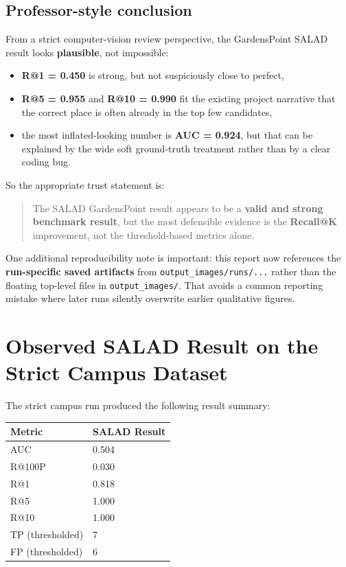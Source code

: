 \documentclass[11pt]{article}
\begin{document}
\subsection*{Professor-style conclusion}
From a strict computer-vision review perspective, the GardensPoint SALAD result looks \textbf{plausible}, not impossible:
\begin{itemize}[leftmargin=*]
  \item \textbf{R@1 = 0.450} is strong, but not suspiciously close to perfect,
  \item \textbf{R@5 = 0.955} and \textbf{R@10 = 0.990} fit the existing project narrative that the correct place is often already in the top few candidates,
  \item the most inflated-looking number is \textbf{AUC = 0.924}, but that can be explained by the wide soft ground-truth treatment rather than by a clear coding bug.
\end{itemize}

So the appropriate trust statement is:
\begin{quote}
The SALAD GardensPoint result appears to be a \textbf{valid and strong benchmark result}, but the most defensible evidence is the \textbf{Recall@K} improvement, not the threshold-based metrics alone.
\end{quote}

One additional reproducibility note is important: this report now references the \textbf{run-specific saved artifacts} from \texttt{output\_images/runs/...} rather than the floating top-level files in \texttt{output\_images/}. That avoids a common reporting mistake where later runs silently overwrite earlier qualitative figures.

\section*{Observed SALAD Result on the Strict Campus Dataset}
The strict campus run produced the following result summary:

\begin{center}
\begin{tabular}{L{2.8cm}L{2.2cm}}
\toprule
\textbf{Metric} & \textbf{SALAD Result} \\
\midrule
AUC & 0.504 \\
R@100P & 0.030 \\
R@1 & 0.818 \\
R@5 & 1.000 \\
R@10 & 1.000 \\
TP (thresholded) & 7 \\
FP (thresholded) & 6 \\
\bottomrule
\end{tabular}
\end{center}
\end{document}
